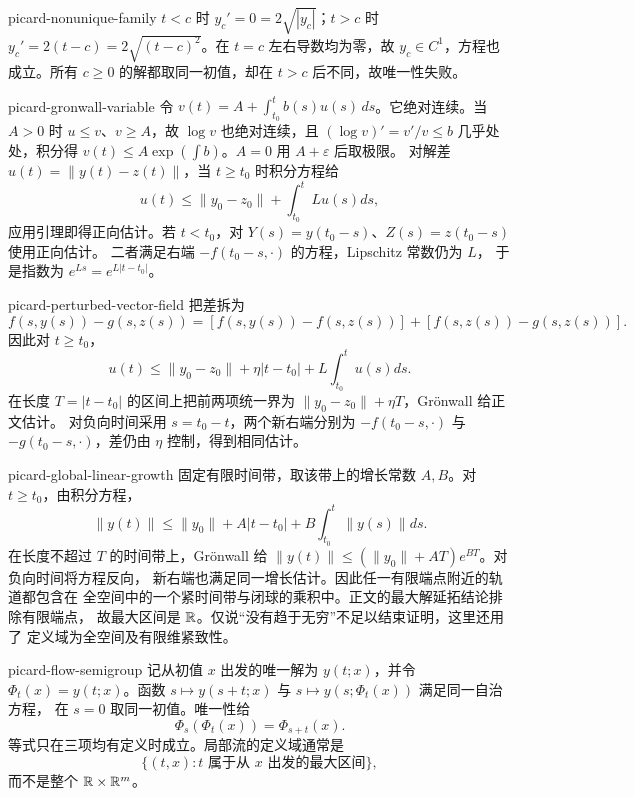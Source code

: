 \begin{solution}{picard-nonunique-family}
\(t<c\) 时 \(y_c'=0=2\sqrt{|y_c|}\)；\(t>c\) 时
\(y_c'=2(t-c)=2\sqrt{(t-c)^2}\)。在 \(t=c\) 左右导数均为零，故
\(y_c\in C^1\)，方程也成立。所有 \(c\ge0\) 的解都取同一初值，却在
\(t>c\) 后不同，故唯一性失败。
\end{solution}

\begin{solution}{picard-gronwall-variable}
令 \(v(t)=A+\int_{t_0}^t b(s)u(s)\,ds\)。它绝对连续。当 \(A>0\) 时 \(u\le v\)、\(v\ge A\)，故 \(\log v\) 也绝对连续，且
\((\log v)'=v'/v\le b\) 几乎处处，积分得
\(v(t)\le A\exp(\int b)\)。\(A=0\) 用 \(A+\varepsilon\) 后取极限。
对解差 \(u(t)=\|y(t)-z(t)\|\)，当 \(t\ge t_0\) 时积分方程给
\[
 u(t)\le\|y_0-z_0\|+\int_{t_0}^{t}Lu(s)ds,
\]
应用引理即得正向估计。若 \(t<t_0\)，对
\(Y(s)=y(t_0-s)\)、\(Z(s)=z(t_0-s)\) 使用正向估计。
二者满足右端 \(-f(t_0-s,\cdot)\) 的方程，Lipschitz 常数仍为 \(L\)，
于是指数为 \(e^{Ls}=e^{L|t-t_0|}\)。
\end{solution}

\begin{solution}{picard-perturbed-vector-field}
把差拆为
\[
 f(s,y(s))-g(s,z(s))
 =[f(s,y(s))-f(s,z(s))]+[f(s,z(s))-g(s,z(s))].
\]
因此对 \(t\ge t_0\)，
\[
 u(t)\le\|y_0-z_0\|+\eta|t-t_0|+
 L\int_{t_0}^{t}u(s)ds.
\]
在长度 \(T=|t-t_0|\) 的区间上把前两项统一界为
\(\|y_0-z_0\|+\eta T\)，Grönwall 给正文估计。
对负向时间采用 \(s=t_0-t\)，两个新右端分别为 \(-f(t_0-s,\cdot)\)
与 \(-g(t_0-s,\cdot)\)，差仍由 \(\eta\) 控制，得到相同估计。
\end{solution}

\begin{solution}{picard-global-linear-growth}
固定有限时间带，取该带上的增长常数 \(A,B\)。对 \(t\ge t_0\)，由积分方程，
\[
 \|y(t)\|\le\|y_0\|+A|t-t_0|+
 B\int_{t_0}^{t}\|y(s)\|ds.
\]
在长度不超过 \(T\) 的时间带上，Grönwall 给
\(\|y(t)\|\le(\|y_0\|+AT)e^{BT}\)。对负向时间将方程反向，
新右端也满足同一增长估计。因此任一有限端点附近的轨道都包含在
全空间中的一个紧时间带与闭球的乘积中。正文的最大解延拓结论排除有限端点，
故最大区间是 \(\mathbb{R}\)。仅说“没有趋于无穷”不足以结束证明，这里还用了
定义域为全空间及有限维紧致性。
\end{solution}

\begin{solution}{picard-flow-semigroup}
记从初值 \(x\) 出发的唯一解为 \(y(t;x)\)，并令
\(\Phi_t(x)=y(t;x)\)。函数
\(s\mapsto y(s+t;x)\) 与 \(s\mapsto y(s;\Phi_t(x))\) 满足同一自治方程，
在 \(s=0\) 取同一初值。唯一性给
\[
 \Phi_s(\Phi_t(x))=\Phi_{s+t}(x).
\]
等式只在三项均有定义时成立。局部流的定义域通常是
\[
 \{(t,x):t\text{ 属于从 }x\text{ 出发的最大区间}\},
\]
而不是整个 \(\mathbb{R}\times\mathbb{R}^m\)。
\end{solution}

